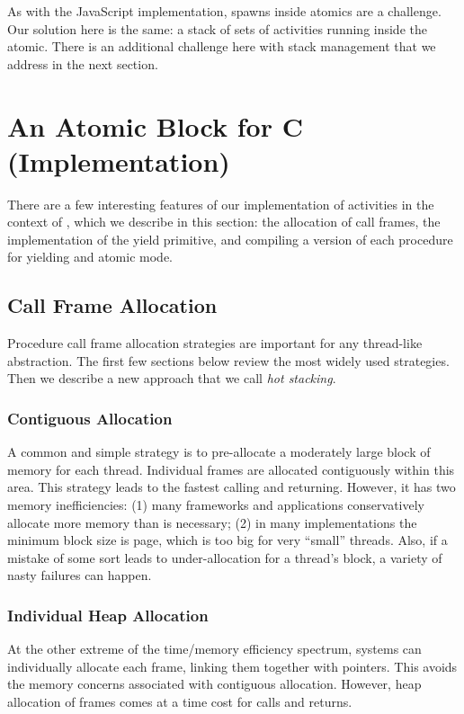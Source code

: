 \documentclass[acmsmall,anonymous,review]{acmart}\settopmatter{printfolios=true,printccs=false,printacmref=false}
\begin{document}
As with the JavaScript implementation, spawns inside atomics are a challenge.
Our solution here is the same: a stack of sets of activities running inside the atomic.
There is an additional challenge here with stack management that we address in the next section.

\section{An Atomic Block for C (Implementation)}

There are a few interesting features of our implementation of activities in the context of \charcoal{}, which we describe in this section: the allocation of call frames, the implementation of the yield primitive, and compiling a version of each procedure for yielding and atomic mode.

\subsection{Call Frame Allocation}

Procedure call frame allocation strategies are important for any thread-like abstraction.
The first few sections below review the most widely used strategies.
Then we describe a new approach that we call \emph{hot stacking}.

\subsubsection{Contiguous Allocation}

A common and simple strategy is to pre-allocate a moderately large block of memory for each thread.
Individual frames are allocated contiguously within this area.
This strategy leads to the fastest calling and returning.
However, it has two memory inefficiencies: (1) many frameworks and applications conservatively allocate more memory than is necessary; (2) in many implementations the minimum block size is page, which is too big for very ``small'' threads.
Also, if a mistake of some sort leads to under-allocation for a thread's block, a variety of nasty failures can happen.

\subsubsection{Individual Heap Allocation}

At the other extreme of the time/memory efficiency spectrum, systems can individually allocate each frame, linking them together with pointers.
This avoids the memory concerns associated with contiguous allocation.
However, heap allocation of frames comes at a time cost for calls and returns.
\end{document}
